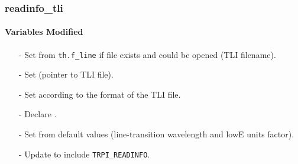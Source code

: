 \documentclass[letterpaper,12pt]{article}
\begin{document}
\subsubsection{readinfo\_tli}
\paragraph{Variables Modified}
\begin{enumerate}[leftmargin=10pt, noitemsep, parsep=0pt, topsep=0ex]
\item[-] Set  from {\tt th.f\_line} if file
  exists and could be opened (TLI filename).
\item[-] Set  (pointer to TLI file).
\item[-] Set  according to the format of the TLI file.
\item[-] Declare .
\item[-] Set  from
  default values (line-transition wavelength and lowE units factor).
\item[-] Update  to include {\tt TRPI\_READINFO}.
\end{enumerate}
\end{document}
